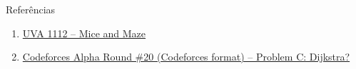 \begin{frame}[fragile]{Referências}

    \begin{enumerate}
        \item \href{https://uva.onlinejudge.org/index.php?option=com_onlinejudge&Itemid=8&category=24&page=show_problem&problem=3553}{UVA 1112 -- Mice and Maze}

        \item \href{https://codeforces.com/problemset/problem/20/C}{Codeforces Alpha Round \#20 (Codeforces format) -- Problem C: Dijkstra?}

    \end{enumerate}

\end{frame}
